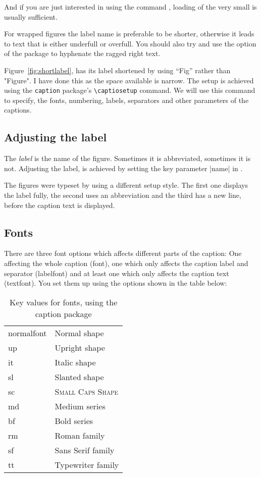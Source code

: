 And if you are just interested in using the
command \cmd{\captionof}, loading of the very small  is usually sufficient.

For wrapped figures the label name is preferable to be shorter, otherwise it leads to text that is either underfull or overfull. You should also try and use the \cmd{\RaggedRight} option of the  package to hyphenate the ragged right text.

Figure~\ref{fig:shortlabel}, has its label shortened by using ``Fig'' rather than "Figure". I have done this as the space available is narrow. The setup is achieved using the \texttt{caption} package's \verb+\captiosetup+ command. We will use this command to specify, the fonts, numbering, labels, separators and other parameters of the captions.

\subsection{Adjusting the label}%

The \emph{label} is the name of the figure. Sometimes it is abbreviated, sometimes it is not. Adjusting the label, is achieved by setting the key parameter |name| in \cmd{\captionsetup}. 

\begin{commands}[]{}
\cmd{\captionsetup}
\end{commands}



The figures were typeset by using a different setup style. The first one displays the  label fully, the second uses an abbreviation and the third has a new line, before the caption text is displayed.

\subsection{Fonts}

There are three font options which affects different parts of the caption: One affecting the
whole caption (font), one which only affects the caption label and separator (labelfont) and at least one which only affects the caption text (textfont). You set them up using the options shown in the table below:

\begin{table}[htp]
\centering
\smaller
\caption{Key values for fonts, using the caption package}
\begin{tabular}{ll}
\toprule
normalfont &Normal shape\\
up &Upright shape\\
it &Italic shape \\
sl &Slanted shape\\
sc & \textsc{Small Caps Shape}\\
md &Medium series\\
bf &Bold series\\
rm &Roman family\\
sf &Sans Serif family\\
tt &Typewriter family\\
\bottomrule
\end{tabular}
\end{table}

